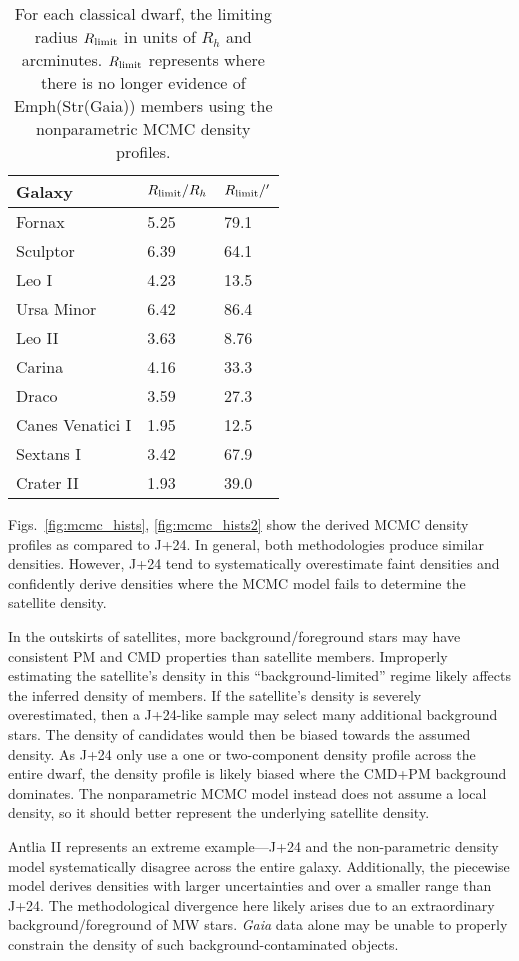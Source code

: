 \begin{table*}[t]
\centering
\caption[The limiting radii of Gaia-derived density profiles]{For each classical dwarf, the limiting radius $R_{\rm limit}$ in units of $R_h$ and arcminutes. $R_{\rm limit}$ represents where there is no longer evidence of Emph(Str(Gaia)) members using the nonparametric MCMC density profiles. }
\label{tbl:mcmc_props}
\begin{tabular}{lll}
\toprule
Galaxy & $R_{\rm limit} / R_h$ & $R_{\rm limit} / '$\\
\midrule
Fornax & 5.25 & 79.1\\
Sculptor & 6.39 & 64.1\\
Leo I & 4.23 & 13.5\\
Ursa Minor & 6.42 & 86.4\\
Leo II & 3.63 & 8.76\\
Carina & 4.16 & 33.3\\
Draco & 3.59 & 27.3\\
Canes Venatici I & 1.95 & 12.5\\
Sextans I & 3.42 & 67.9\\
Crater II & 1.93 & 39.0\\
\bottomrule
\end{tabular}
\end{table*}

Figs.~\ref{fig:mcmc_hists}, \ref{fig:mcmc_hists2} show the derived MCMC
density profiles as compared to J+24. In general, both methodologies
produce similar densities. However, J+24 tend to systematically
overestimate faint densities and confidently derive densities where the
MCMC model fails to determine the satellite density.

In the outskirts of satellites, more background/foreground stars may
have consistent PM and CMD properties than satellite members. Improperly
estimating the satellite's density in this ``background-limited'' regime
likely affects the inferred density of members. If the satellite's
density is severely overestimated, then a J+24-like sample may select
many additional background stars. The density of candidates would then
be biased towards the assumed density. As J+24 only use a one or
two-component density profile across the entire dwarf, the density
profile is likely biased where the CMD+PM background dominates. The
nonparametric MCMC model instead does not assume a local density, so it
should better represent the underlying satellite density.

Antlia II represents an extreme example---J+24 and the non-parametric
density model systematically disagree across the entire galaxy.
Additionally, the piecewise model derives densities with larger
uncertainties and over a smaller range than J+24. The methodological
divergence here likely arises due to an extraordinary
background/foreground of MW stars. \emph{Gaia} data alone may be unable
to properly constrain the density of such background-contaminated
objects.

